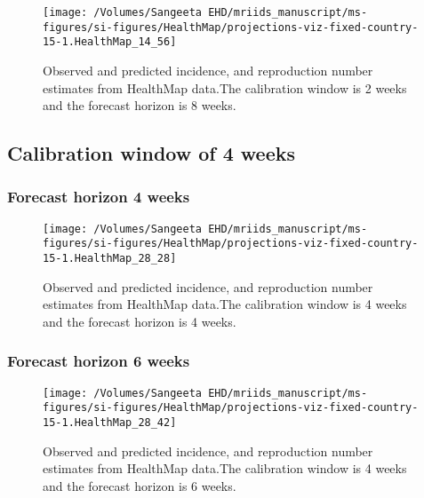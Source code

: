\documentclass[9pt,twoside,lineno]{pnas-new}
\begin{document}
\begin{figure}
  {
    \centering \texttt{[image: /Volumes/Sangeeta EHD/mriids\_manuscript/ms-figures/si-figures/HealthMap/projections-viz-fixed-country-15-1.HealthMap\_14\_56]} 
  }
  \caption{Observed and predicted incidence, and reproduction number
    estimates from HealthMap data.The calibration window is 2 weeks
    and the forecast horizon is 8 weeks.}
    \label{fig:hm28}
\end{figure}

\hypertarget{calibration-window-of-4-weeks-1}{%
  \subsection{Calibration window of 4 weeks}\label{calibration-window-of-4-weeks-1}}

\hypertarget{forecast-horizon-4-weeks-3}{%
  \subsubsection{Forecast horizon 4 weeks}\label{forecast-horizon-4-weeks-3}}

\begin{figure}
  {
    \centering \texttt{[image: /Volumes/Sangeeta EHD/mriids\_manuscript/ms-figures/si-figures/HealthMap/projections-viz-fixed-country-15-1.HealthMap\_28\_28]} 
  }
  \caption{Observed and predicted incidence, and reproduction number
    estimates from HealthMap data.The calibration window is 4 weeks
    and the forecast horizon is 4 weeks.}
      \label{fig:hm44}
\end{figure}

\hypertarget{forecast-horizon-6-weeks-4}{%
  \subsubsection{Forecast horizon 6 weeks}\label{forecast-horizon-6-weeks-4}}

\begin{figure}

  {\centering \texttt{[image: /Volumes/Sangeeta EHD/mriids\_manuscript/ms-figures/si-figures/HealthMap/projections-viz-fixed-country-15-1.HealthMap\_28\_42]} 

  }

  \caption{Observed and predicted incidence, and
    reproduction number estimates from HealthMap data.The calibration
    window is 4 weeks and the forecast horizon is 6 weeks.}
  \label{fig:hm46}
\end{figure}
\end{document}
